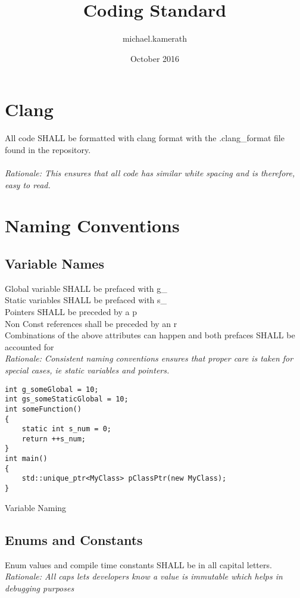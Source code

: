 \documentclass{article}
\title{Coding Standard}
\author{michael.kamerath }
\date{October 2016}
\begin{document}
\maketitle

\renewcommand\listoflistingscaption{List of code examples}
\listoflistings

\newpage\section{Clang}
All code SHALL be formatted with clang format with the .clang\_format file found in the repository. \\ \\
\textit{Rationale: This ensures that all code has similar white spacing and is therefore, easy to read.}

\section{Naming Conventions}
\subsection{Variable Names}
Global variable SHALL be prefaced with g\_ \\
Static variables SHALL be prefaced with s\_ \\
Pointers SHALL be preceded by a p \\
Non Const references shall be preceded by an r \\
Combinations of the above attributes can happen and both prefaces SHALL be accounted for \\
\textit{Rationale: Consistent naming conventions ensures that proper care is taken for special cases, ie static variables and pointers.} \\

\begin{listing}[ht]
\begin{verbatim}
int g_someGlobal = 10;
int gs_someStaticGlobal = 10;
int someFunction()
{
    static int s_num = 0;
    return ++s_num;
}
int main()
{
    std::unique_ptr<MyClass> pClassPtr(new MyClass);
}
\end{verbatim}
\caption{Variable Naming}
\end{listing}

\newpage\subsection{Enums and Constants}
Enum values and compile time constants SHALL be in all capital letters. \\
\textit{Rationale: All caps lets developers know a value is immutable which helps in debugging purposes} \\
\end{document}
